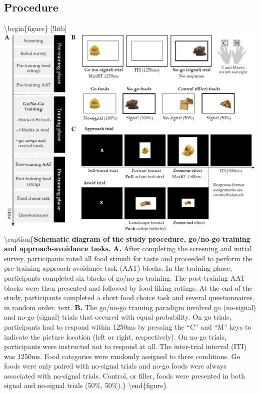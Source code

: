\documentclass[man,floatsintext]{apa6}
\begin{document}
\hypertarget{procedure}{%
\subsection{Procedure}\label{procedure}}

\textbackslash begin\{figure\} {[}!htb{]}
\centering
\includegraphics[width=\linewidth]{figures/Figure1.png}
\textbackslash caption\{\textbf{Schematic diagram of the study procedure, go/no-go training and approach-avoidance tasks.} \textbf{A.} After completing the screening and initial survey, participants rated all food stimuli for taste and proceeded to perform the pre-training approach-avoidance task (AAT) blocks. In the training phase, participants completed six blocks of go/no-go training. The post-training AAT blocks were then presented and followed by food liking ratings. At the end of the study, participants completed a short food choice task and several questionnaires, in random order. text. \textbf{B.} The go/no-go training paradigm involved go (no-signal) and no-go (signal) trials that occured with equal probability. On go trials, participants had to respond within 1250ms by pressing the \enquote{C} and \enquote{M} keys to indicate the picture location (left or right, respectively). On no-go trials, participants were instructed not to respond at all. The inter-trial interval (ITI) was 1250ms. Food categories were randomly assigned to three conditions. Go foods were only paired with no-signal trials and no-go foods were always associated with no-signal trials. Control, or filler, foods were presented in both signal and no-signal trials (50\%, 50\%).\}
\label{fig:1}
\textbackslash end\{figure\}
\end{document}
